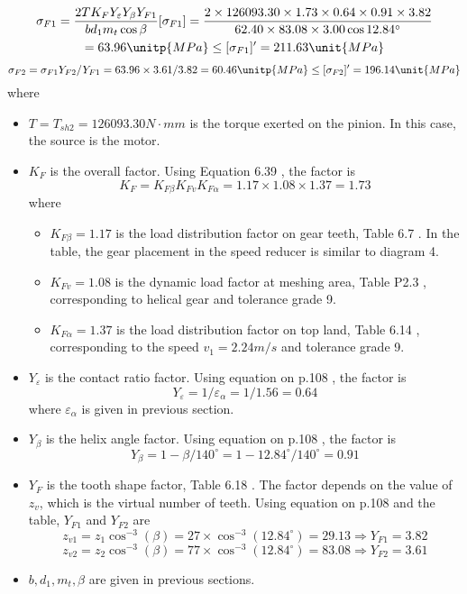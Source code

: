\begin{multline*}
\sigma_{F1} = \dfrac{2TK_FY_\varepsilon Y_\beta Y_{F1}}{bd_1m_t\cos\beta} [\sigma_{F1}]= \dfrac{2\times 126093.30 \times 1.73 \times 0.64 \times 0.91 \times 3.82}{62.40 \times 83.08 \times 3.00 \cos 12.84^\circ}\\
= 63.96 \unitp{MPa} \leq [\sigma_{F1}]' = 211.63 \unit{MPa}
\end{multline*}
\[\sigma_{F2} = \sigma_{F1}Y_{F2}/Y_{F1} = {63.96 \times 3.61}/3.82 = 60.46 \unitp{MPa} \leq [\sigma_{F2}]' = 196.14 \unit{MPa}\]
where
\begin{itemize}
	\item $ T=T_{sh2}=126093.30\unit{N\cdot mm} $ is the torque exerted on the pinion. In this case, the source is the motor.
	\item $ K_F $ is the overall factor. Using Equation 6.39 \cite{tk1}, the factor is
	\[ K_F = K_{F\beta}K_{Fv}K_{F\alpha} = 1.17 \times 1.08 \times 1.37 = 1.73 \]
	where
	\begin{itemize}
		\item $ K_{F\beta} = 1.17 $ is the load distribution factor on gear teeth, Table 6.7 \cite{tk1}. In the table, the gear placement in the speed reducer is similar to diagram 4.
		\item $ K_{Fv} = 1.08 $ is the dynamic load factor at meshing area, Table P2.3 \cite{tk1}, corresponding to helical gear and tolerance grade 9.
		\item $ K_{F\alpha} = 1.37 $ is the load distribution factor on top land, Table 6.14 \cite{tk1}, corresponding to the speed $ v_1=2.24 \unit{m/s} $ and tolerance grade 9.
	\end{itemize}
	\item $ Y_\varepsilon $ is the contact ratio factor. Using equation on p.108 \cite{tk1}, the factor is
	\[ Y_\varepsilon = 1/\varepsilon_\alpha = 1/1.56 = 0.64 \]
	where $ \varepsilon_\alpha $ is given in previous section.
	\item $ Y_\beta $ is the helix angle factor. Using equation on p.108 \cite{tk1}, the factor is
	\[ Y_\beta = 1-{\beta}/{140^\circ}=  1-{12.84^\circ}/{140^\circ}= 0.91 \]
	\item $ Y_F $ is the tooth shape factor, Table 6.18 \cite{tk1}. The factor depends on the value of $ z_v $, which is the virtual number of teeth. Using equation on p.108 \cite{tk1} and the table, $ Y_{F1} $ and $ Y_{F2} $ are
	\[ z_{v1} = z_1\cos^{-3}(\beta) = 27\times\cos^{-3}(12.84^\circ) = 29.13\Rightarrow Y_{F1} = 3.82\]
	\[ z_{v2} = z_2\cos^{-3}(\beta) = 77\times\cos^{-3}(12.84^\circ) = 83.08\Rightarrow Y_{F2} = 3.61\]
	\item $ b,d_1,m_t,\beta $ are given in previous sections.
\end{itemize}
%
%


